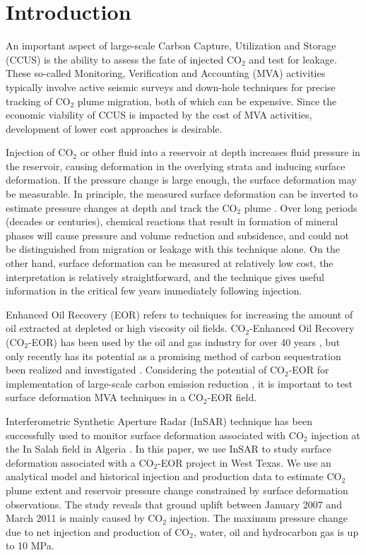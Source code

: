 \section{Introduction}

An important aspect of large-scale Carbon Capture, Utilization and Storage (CCUS) is the ability to assess the fate of injected CO$_{2}$ and test for leakage.  These so-called Monitoring, Verification and Accounting (MVA) activities typically involve active seismic surveys and down-hole techniques for precise tracking of CO$_{2}$ plume migration, both of which can be expensive.  Since the economic viability of CCUS is impacted by the cost of MVA activities, development of lower cost approaches is desirable.

Injection of CO$_{2}$ or other fluid into a reservoir at depth increases fluid pressure in the reservoir, causing deformation in the overlying strata and inducing surface deformation.  If the pressure change is large enough, the surface deformation may be measurable.  In principle, the measured surface deformation can be inverted to estimate pressure changes at depth and track the CO$_{2}$ plume \cite[e.g.,][]{vasco2008reservoir,vasco2010satellite,rinaldi2013modeling,white2014geomechanical,karegar2015gps}.  Over long periods (decades or centuries), chemical reactions that result in formation of mineral phases will cause pressure and volume reduction and subsidence, and could not be distinguished from migration or leakage with this technique alone.  On the other hand, surface deformation can be measured at relatively low cost, the interpretation is relatively straightforward, and the technique gives useful information in the critical few years immediately following injection.

Enhanced Oil Recovery (EOR) refers to techniques for increasing the amount of oil extracted at depleted or high viscosity oil fields.   CO$_{2}$-Enhanced Oil Recovery (CO$_{2}$-EOR) has been used by the oil and gas industry for over 40 years \cite[]{orr1984use}, but only recently has its potential as a promising method of carbon sequestration been realized and investigated \cite[]{bryant2007geologic}.  Considering the potential of CO$_{2}$-EOR for implementation of large-scale carbon emission reduction \cite[]{metz2005carbon}, it is important to test surface deformation MVA techniques in a CO$_{2}$-EOR field.

Interferometric Synthetic Aperture Radar (InSAR) technique has been successfully used to monitor surface deformation associated with CO$_{2}$ injection at the In Salah field in Algeria \cite[]{mathias2009approximate,morris2011study,shi2012assessment,verdon2013comparison}.  In this paper, we use InSAR to study surface deformation associated with a CO$_{2}$-EOR project in West Texas.  We use an analytical model and historical injection and production data to estimate CO$_{2}$ plume extent and reservoir pressure change constrained by surface deformation observations. The study reveals that ground uplift between January 2007 and March 2011 is mainly caused by CO$_{2}$ injection.   The maximum pressure change due to net injection and production of CO$_{2}$, water, oil and hydrocarbon gas is up to 10 MPa.


